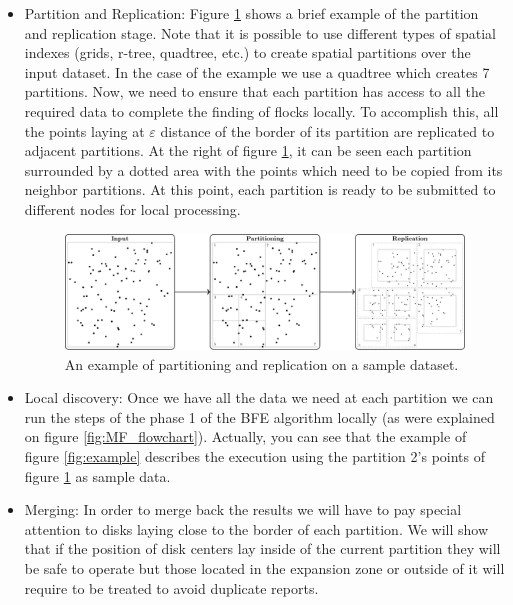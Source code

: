\documentclass[journal,onecolumn]{IEEEtran}
\begin{document}
\begin{itemize}

\item Partition and Replication: Figure \ref{fig:partrep} shows a brief example of the partition and replication stage.  Note that it is possible to use different types of spatial indexes (grids, r-tree, quadtree, etc.) to create spatial partitions over the input dataset.  In the case of the example we use a quadtree which creates 7 partitions.  Now, we need to ensure that each partition has access to all the required data to complete the finding of flocks locally.  To accomplish this, all the points laying at $\varepsilon$ distance of the border of its partition are replicated to adjacent partitions.  At the right of figure \ref{fig:partrep},  it can be seen each partition surrounded by a dotted area with the points which need to be copied from its neighbor partitions.  At this point, each partition is ready to be submitted to different nodes for local processing.

\begin{figure}[!ht]
    \centering
    \includegraphics[width=\textwidth]{figures/MF_stages/P123}
    \caption{An example of partitioning and replication on a sample dataset.}\label{fig:partrep}
\end{figure}

\item Local discovery: Once we have all the data we need at each partition we can run the steps of the phase 1 of the BFE algorithm locally (as were explained on figure \ref{fig:MF_flowchart}).  Actually, you can see that the example of figure \ref{fig:example} describes the execution using the partition 2's points of figure \ref{fig:partrep} as sample data.

\item Merging:  In order to merge back the results we will have to pay special attention to disks laying close to the border of each partition.  We will show that if the position of disk centers lay inside of the current partition they will be safe to operate but those located in the expansion zone or outside of it will require to be treated to avoid duplicate reports.  


\end{itemize}
\end{document}
